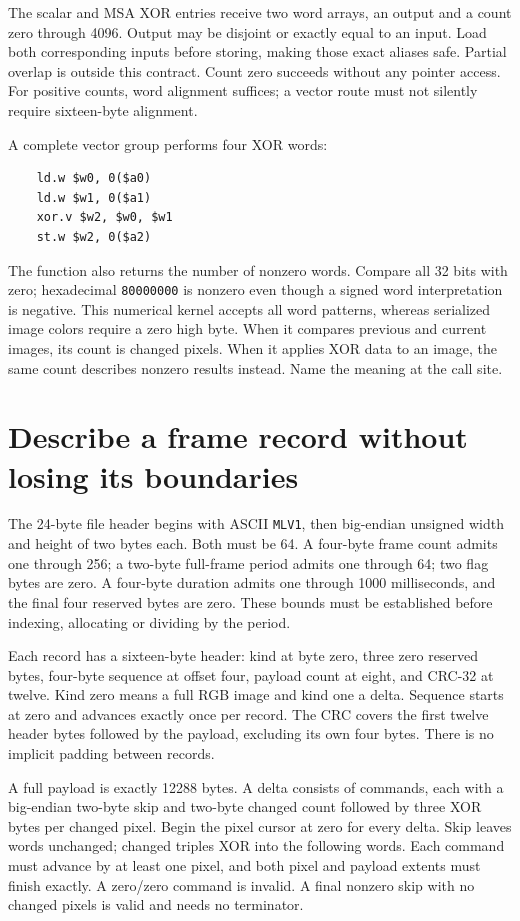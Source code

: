 The scalar and MSA XOR entries receive two word arrays, an output and a count
zero through 4096. Output may be disjoint or exactly equal to an input. Load
both corresponding inputs before storing, making those exact aliases safe.
Partial overlap is outside this contract. Count zero succeeds without any
pointer access. For positive counts, word alignment suffices; a vector route
must not silently require sixteen-byte alignment.

A complete vector group performs four XOR words:
\begin{verbatim}
    ld.w $w0, 0($a0)
    ld.w $w1, 0($a1)
    xor.v $w2, $w0, $w1
    st.w $w2, 0($a2)
\end{verbatim}
The function also returns the number of nonzero words. Compare all 32 bits
with zero; hexadecimal \texttt{80000000} is nonzero even though a signed word
interpretation is negative. This numerical kernel accepts all word patterns,
whereas serialized image colors require a zero high byte. When it compares
previous and current images, its count is changed pixels. When it applies XOR
data to an image, the same count describes nonzero results instead. Name the
meaning at the call site.

\section{Describe a frame record without losing its boundaries}

The 24-byte file header begins with ASCII \texttt{MLV1}, then big-endian
unsigned width and height of two bytes each. Both must be 64. A four-byte frame
count admits one through 256; a two-byte full-frame period admits one through
64; two flag bytes are zero. A four-byte duration admits one through 1000
milliseconds, and the final four reserved bytes are zero. These bounds must be
established before indexing, allocating or dividing by the period.

Each record has a sixteen-byte header: kind at byte zero, three zero reserved
bytes, four-byte sequence at offset four, payload count at eight, and CRC-32
at twelve. Kind zero means a full RGB image and kind one a delta. Sequence
starts at zero and advances exactly once per record. The CRC covers the first
twelve header bytes followed by the payload, excluding its own four bytes.
There is no implicit padding between records.

A full payload is exactly 12288 bytes. A delta consists of commands, each with
a big-endian two-byte skip and two-byte changed count followed by three XOR
bytes per changed pixel. Begin the pixel cursor at zero for every delta. Skip
leaves words unchanged; changed triples XOR into the following words. Each
command must advance by at least one pixel, and both pixel and payload extents
must finish exactly. A zero/zero command is invalid. A final nonzero skip with
no changed pixels is valid and needs no terminator.

